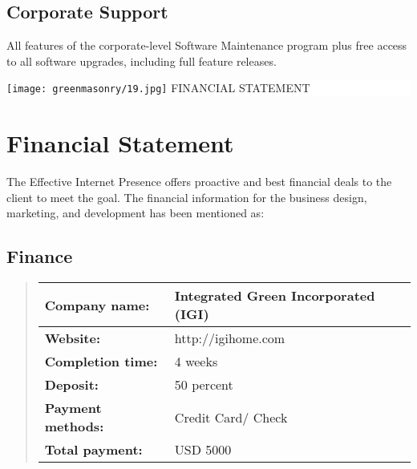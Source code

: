 \documentclass[35pt]{report}
\begin{document}
		\section{Corporate Support}
		All features of the corporate-level Software Maintenance program plus free access to all software upgrades, including full feature releases.				

\clearpage

\thispagestyle{empty}

\vspace*{2cm}
\colorbox{white}{
	\parbox[t]{1.0\linewidth}{
       	\begin{center} 
			\fontsize{40pt}{11pt}\selectfont 
			\vspace*{.5cm}
				{\texttt{[image: greenmasonry/19.jpg]}}
				{FINANCIAL STATEMENT}
			\vspace*{.5cm}
		\end{center}
	}
}


\clearpage

\normalsize

	\chapter{Financial Statement}
		The Effective Internet Presence offers proactive and best financial deals to the client to meet the goal. The financial information for the business design, marketing, and development has been mentioned as:

		\section{Finance}
		\begin{quote}
		\begin{center}
		 	\begin{tabular}{| p{4cm}| p{6cm} |}\hline
				\bfseries Company name: & Integrated Green Incorporated (IGI)\\ \hline
				\bfseries Website: & http://igihome.com \\ \hline
				\bfseries Completion time: & 4 weeks\\ \hline
				\bfseries Deposit: & 50 percent \\ \hline
				\bfseries Payment methods: & Credit Card/ Check \\ \hline
				\bfseries Total payment: & USD 5000 \\ \hline
			\end{tabular}
		\end{center}
		\end{quote}
\clearpage
\end{document}
